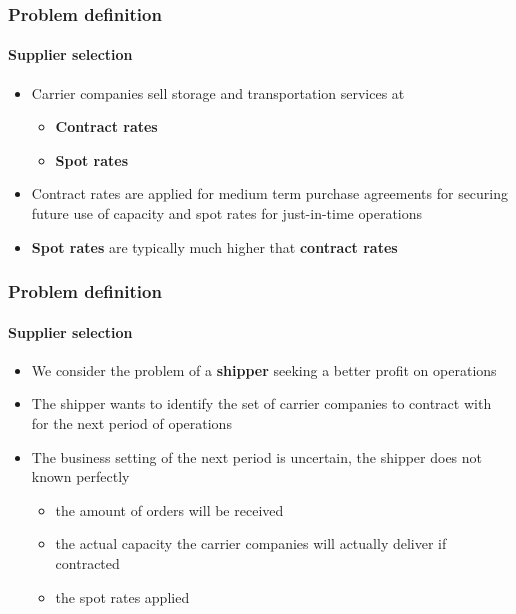 \documentclass[9pt,xcolor={dvipsnames}]{beamer}
\begin{document}
\begin{frame}[allowframebreaks]
	\frametitle{Problem definition}
	\framesubtitle{Supplier selection}
	\begin{itemize}
		\item Carrier companies sell storage and transportation services at
		\bigskip
		\begin{itemize}
			\item \textbf{Contract rates}
			\medskip
			\item \textbf{Spot rates}
		\end{itemize}
		\bigskip
		\item Contract rates are applied for medium term purchase agreements for securing future use of capacity and spot rates for just-in-time operations
		\bigskip
		\item \textbf{\color{purple} Spot rates} are typically much higher that \textbf{\color{blue} contract rates}
	\end{itemize}
\end{frame}

\begin{frame}[allowframebreaks]
	\frametitle{Problem definition}
	\framesubtitle{Supplier selection}
	\begin{itemize}
		\item We consider the problem of a \textbf{shipper} seeking a better profit on operations 
		\bigskip
		\item The shipper wants to identify the set of carrier companies to contract with for the next period of operations
		\bigskip
		\item The business setting of the next period is uncertain, the shipper does not known perfectly
		\bigskip
		\begin{itemize}
			\item the amount of orders will be received
			\bigskip
			\item the actual capacity the carrier companies will actually deliver if contracted
			\bigskip
			\item the spot rates applied
		\end{itemize}
	\end{itemize}
\end{frame}
\end{document}
